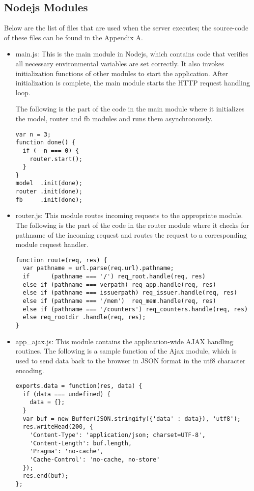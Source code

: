 \subsection{Nodejs Modules}
Below are the list of files that are used when the server executes; the source-code of these files can be found in the Appendix A.

\begin{itemize}
\item main.js: This is the main module in Nodejs, which contains code that verifies all necessary environmental variables are set correctly. It also invokes initialization functions of other modules to start the application.  After initialization is complete, the main module starts the HTTP request handling loop. 

The following is the part of the code in the main module where it initializes the model, router and fb modules and runs them asynchronously. 
\begin{lstlisting}
var n = 3;
function done() {
  if (--n === 0) {
    router.start();
  }  
}
model  .init(done);
router .init(done);
fb     .init(done);
\end{lstlisting} 

\item router.js: This module routes incoming requests to the appropriate module. The following is the part of the code in the router module where it checks for pathname of the incoming request and routes the request to a corresponding module request handler.
\begin{lstlisting}
function route(req, res) {
  var pathname = url.parse(req.url).pathname;
  if      (pathname === '/') req_root.handle(req, res)
  else if (pathname === verpath) req_app.handle(req, res)
  else if (pathname === issuerpath) req_issuer.handle(req, res)
  else if (pathname === '/mem')  req_mem.handle(req, res)
  else if (pathname === '/counters') req_counters.handle(req, res)
  else req_rootdir .handle(req, res);
}
\end{lstlisting} 


\item app{\_}ajax.js: This module contains the application-wide AJAX handling routines. The following is a sample function of the Ajax module, which is used to send data back to the browser in JSON format in the utf8 character encoding.
\begin{lstlisting}
exports.data = function(res, data) {
  if (data === undefined) {
    data = {};
  }
  var buf = new Buffer(JSON.stringify({'data' : data}), 'utf8');
  res.writeHead(200, {
    'Content-Type': 'application/json; charset=UTF-8',
    'Content-Length': buf.length,
    'Pragma': 'no-cache',
    'Cache-Control': 'no-cache, no-store'
  });
  res.end(buf);
};
\end{lstlisting} 



\end{itemize}
